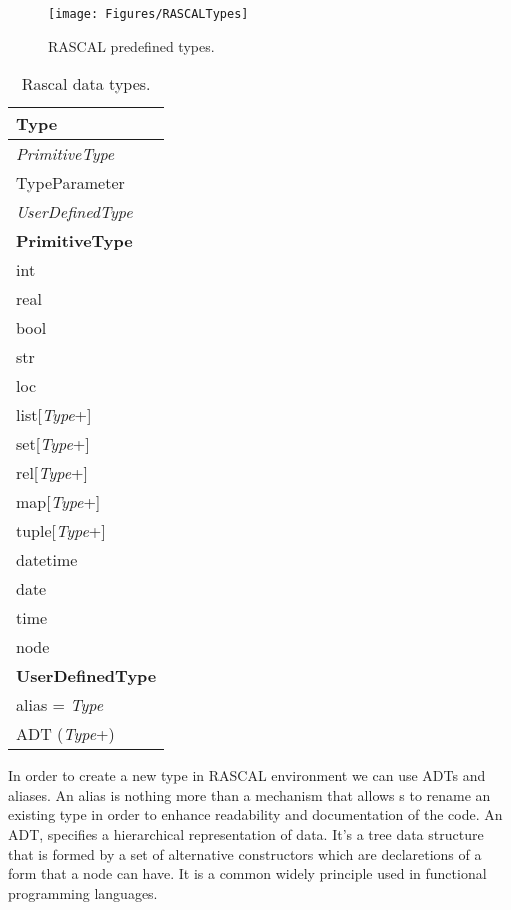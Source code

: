 \begin{figure}[h]
\centering
\texttt{[image: Figures/RASCALTypes]}
\caption{RASCAL predefined types\cite{rascalstatic}.}
\label{fig:rascalTypes}
\end{figure}

\begin{table}
\centering
    \begin{tabular}{l}
    \hline
    \textbf{Type}          \\ \hline
    \textit{PrimitiveType} \\
    TypeParameter \\
    \textit{UserDefinedType}\\  \hline
    \textbf{PrimitiveType} \\ \hline
    int           \\
    real         \\
    bool          \\
    str           \\
    loc         \\ 
    list[\textit{Type}+]   \\
    set[\textit{Type}+]    \\
    rel[\textit{Type}+]    \\
    map[\textit{Type}+]    \\
    tuple[\textit{Type}+]\\
    datetime\\
    date\\
    time\\
    node\\\hline
    \textbf{UserDefinedType} \\ \hline
    alias = \textit{Type}\\
    ADT (\textit{Type}+)\\ \hline
    \end{tabular}
    \caption{Rascal data types.}
    \label{tbl:RascalDataTypes}
\end{table}

In order to create a new type in RASCAL environment we can use ADTs and aliases. An alias is nothing more than a mechanism that allows s to rename an existing type in order to enhance readability and documentation of the code.  An ADT, specifies a hierarchical representation of data. It's a tree data structure that is formed by a set of alternative constructors which are declaretions of a form that a node can have. It is a common widely principle used in functional programming languages. 

